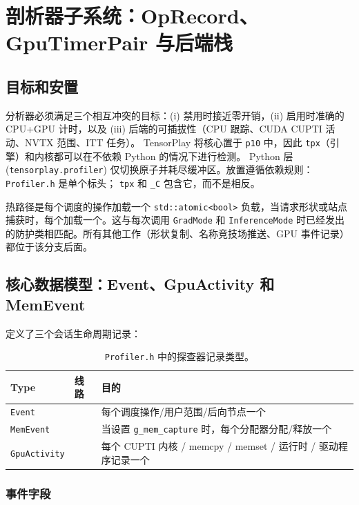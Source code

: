 \section{剖析器子系统：OpRecord、GpuTimerPair 与后端栈}
\label{sec:profiler}

\subsection{目标和安置}

分析器必须满足三个相互冲突的目标：(i) 禁用时接近零开销，(ii) 启用时准确的 CPU+GPU 计时，以及 (iii) 后端的可插拔性（CPU 跟踪、CUDA CUPTI 活动、NVTX 范围、ITT 任务）。 TensorPlay 将核心置于 \texttt{p10} 中，因此 \texttt{tpx}（引擎）和内核都可以在不依赖 Python 的情况下进行检测。 Python 层 (\texttt{tensorplay.profiler}) 仅切换原子并耗尽缓冲区。放置遵循依赖规则：\texttt{Profiler.h} 是单个标头； \texttt{tpx} 和 \texttt{\_C} 包含它，而不是相反。

热路径是每个调度的操作加载一个 \texttt{std::atomic<bool>} 负载，当请求形状或站点捕获时，每个加载一个。这与每次调用 \texttt{GradMode} 和 \texttt{InferenceMode} 时已经发出的防护类相匹配。所有其他工作（形状复制、名称竞技场推送、GPU 事件记录）都位于该分支后面。

\subsection{核心数据模型：Event、GpuActivity 和 MemEvent}

定义了三个会话生命周期记录：

\begin{table}[H]
\centering
\caption{\texttt{Profiler.h} 中的探查器记录类型。}
\label{tab:profrecords}
\small
\begin{tabular}{lll}
\toprule
Type & 线路 & 目的 \\
\midrule
\texttt{Event} &  & 每个调度操作/用户范围/后向节点一个 \\
\texttt{MemEvent} &  & 当设置 \texttt{g\_mem\_capture} 时，每个分配器分配/释放一个 \\
\texttt{GpuActivity} &  & 每个 CUPTI 内核 / memcpy / memset / 运行时 / 驱动程序记录一个 \\
\bottomrule
\end{tabular}
\end{table}

\subsubsection{事件字段}

